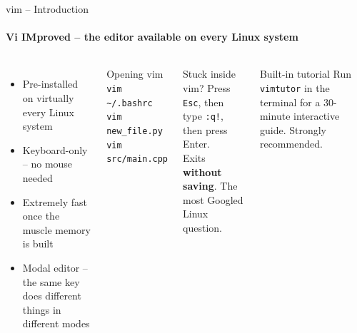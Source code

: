 \documentclass[aspectratio=169]{beamer}
\begin{document}
\begin{frame}{vim -- Introduction}
  \framesubtitle{Vi IMproved -- the editor available on every Linux system}
  \begin{columns}
      \begin{itemize}
        \item Pre-installed on virtually every Linux system
        \item Keyboard-only -- no mouse needed
        \item Extremely fast once the muscle memory is built
        \item \alert{Modal editor} -- the same key does
              different things in different modes
      \end{itemize}
      \begin{block}{Opening vim}
        \texttt{vim \textasciitilde/.bashrc}\\
        \texttt{vim new\_file.py}\\
        \texttt{vim src/main.cpp}
      \end{block}
      \begin{alertblock}{Stuck inside vim?}
        Press \texttt{Esc}, then type \texttt{:q!},
        then press Enter.\\[0.3em]
        Exits \textbf{without saving}.
        The most Googled Linux question.
      \end{alertblock}
      \vspace{0.4em}
      \begin{exampleblock}{Built-in tutorial}
        Run \texttt{vimtutor} in the terminal
        for a 30-minute interactive guide.
        Strongly recommended.
      \end{exampleblock}
  \end{columns}
\end{frame}
\end{document}
